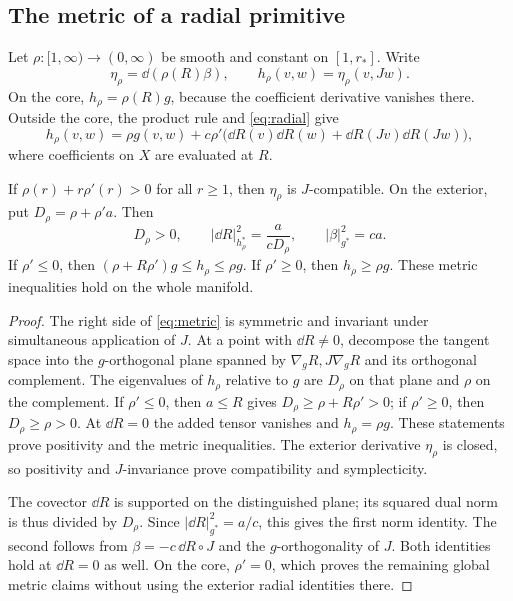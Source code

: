 \subsection{The metric of a radial primitive}
Let $\rho:[1,\infty)\to(0,\infty)$ be smooth and constant on
$[1,r_*]$. Write
\[
 \eta_\rho=\dd(\rho(R)\beta),\qquad
 h_\rho(v,w)=\eta_\rho(v,Jw).
\]
On the core, $h_\rho=\rho(R)g$, because the coefficient derivative
vanishes there. Outside the core, the product rule and
\eqref{eq:radial} give
\begin{equation}\label{eq:metric}
 h_\rho(v,w)=\rho g(v,w)
 +c\rho'\bigl(\dd R(v)\dd R(w)+\dd R(Jv)\dd R(Jw)\bigr),
\end{equation}
where coefficients on $X$ are evaluated at $R$.

\begin{lemma}\label{lem:metric}
If $\rho(r)+r\rho'(r)>0$ for all $r\ge1$, then $\eta_\rho$
is $J$-compatible. On the exterior, put $D_\rho=\rho+\rho'a$.
Then
\begin{equation}\label{eq:dual}
 D_\rho>0,\qquad
 |\dd R|_{h_\rho^*}^2=\frac{a}{cD_\rho},\qquad
 |\beta|_{g^*}^2=ca.
\end{equation}
If $\rho'\le0$, then
$(\rho+R\rho')g\le h_\rho\le\rho g$.
If $\rho'\ge0$, then $h_\rho\ge\rho g$.
These metric inequalities hold on the whole manifold.
\end{lemma}
\begin{proof}
The right side of \eqref{eq:metric} is symmetric and invariant under
simultaneous application of $J$. At a point with $\dd R\ne0$, decompose
the tangent space into the $g$-orthogonal plane spanned by
$\nabla_g R,J\nabla_g R$ and its orthogonal complement.
The eigenvalues of $h_\rho$ relative to $g$ are $D_\rho$ on
that plane and $\rho$ on the complement.
If $\rho'\le0$, then $a\le R$ gives
$D_\rho\ge\rho+R\rho'>0$; if $\rho'\ge0$, then $D_\rho\ge\rho>0$.
At $\dd R=0$ the added tensor vanishes and $h_\rho=\rho g$.
These statements prove positivity and the metric inequalities.
The exterior derivative $\eta_\rho$ is closed, so positivity and
$J$-invariance prove compatibility and symplecticity.

The covector $\dd R$ is supported on the distinguished plane;
its squared dual norm is thus divided by $D_\rho$.
Since $|\dd R|_{g^*}^2=a/c$, this gives the first norm identity.
The second follows from $\beta=-c\,\dd R\circ J$ and the
$g$-orthogonality of $J$. Both identities hold at $\dd R=0$
as well. On the core, $\rho'=0$, which proves the remaining
global metric claims without using the exterior radial identities
there.
\end{proof}

